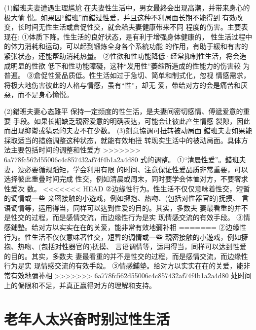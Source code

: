 \documentclass[12pt,UTF8]{ctexbook}
\begin{document}
(1)錯班夫妻遭遇生理尴尬
在夫妻性生活中，男女最終会出现高潮，并带来身心的极大愉
悦。如果因“錯班”而錯过性爱，并且这种不利局面长期不能得到
有效改变，长时间无性生活或倉促性交，就会耠夫妻健康带来不同
程度的伤害。主要表现在:
①体质下降。性生活的良好状态，是有利于增强身体健康的，
性生活过程中的体力消耗和运动，可以起到锻炼全身各个系統功能
的作用，有助于緩和有害的紧张状态，还能帮助消耗热量。
②性欲和性功能降低·经常抑制性生活，将会造成明显的性欲
低下和性功能障礙，这种“发用性”萎缩所造成的性能力的伤害较
为普遍。
③倉促性爱品质低。性生活如过于急切、简单和制式化，忽视
情感需求，将极大地伤害彼此的人格与情感，虽有“性”，却无
爱，带给对方的会是痛苦和厌惡，而不是身心愉悦。

(2)錯班夫妻心态難平
保持一定频度的性生活，是夫妻间密切感情、傅遞爱意的重要
手段。如果长期缺乏親密爱意的明确表达，可能会让彼此产生情感
裂隙，因此而出现抑鬱或猜忌的夫妻不在少数。
(3)刻意協调可扭转被动局面
錯班夫妻如果能採取适当的措施调整这种状态，就能有效地扭
转现实生活中的被动局面。具体方法主要包括时间的调整和性爱方
>>>>>>> 6a778fc562d55006c4c857432af74f4b1a2a4d80
式的调整。
①“清晨性爱”。錯班夫妻，没必要循规蹈矩，学会利用有限
的时间、注意保证性爱品质非常重要，可以选择彼此重疊时间完成
性交，例如清晨或周末，同时要学会体恤对方，不要奢求性爱次
数。
<<<<<<< HEAD
②边缘性行为。性生活不仅仅意味着性交，短暫的调情或一些
亲密接触的小遊戏，例如擁抱、热吻、(包括对性器官的)抚摸、
言语调情等，运用得当，同样可以达到性爱的目的。其实，多数夫
妻最看重的并不是性交的过程，而是感情交流，而边缘性行为是实
现情感交流的有效手段。
③情感鋪墊。给对方以实实在在的关爱，能非常有效地彌补相
=======
②边缘性行为。性生活不仅仅意味著性交，短暫的调情或一些
親密接触的小遊戏，例如擁抱、热吻、(包括对性器官的)抚摸、
言语调情等，运用得当，同样可以达到性爱的目的。其实，多数夫
妻最看重的并不是性交的过程，而是感情交流，而边缘性行为是实
现情感交流的有效手段。
③情感鋪墊。给对方以实实在在的关爱，能非常有效地彌补相
>>>>>>> 6a778fc562d55006c4c857432af74f4b1a2a4d80
处时间上的侷限和不足，并真正赢得对方的理解和支持。


\section{老年人太兴奋时别过性生活}
\end{document}
